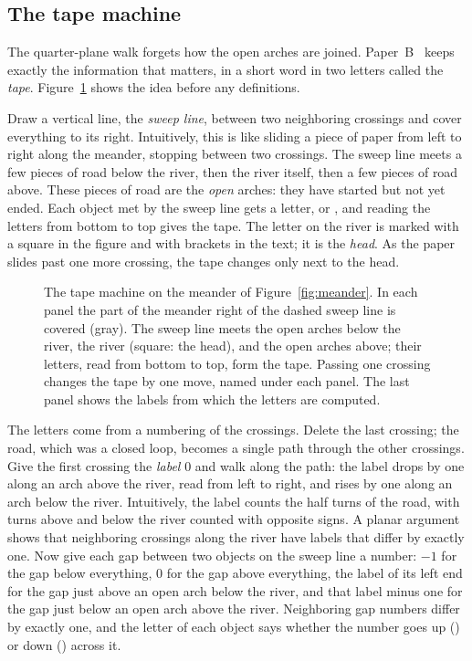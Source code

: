 \subsection{The tape machine}\label{sec:tape}

The quarter-plane walk forgets how the open arches are joined. Paper~B~\cite{PaperB} keeps exactly
the information that matters, in a short word in two letters called the \emph{tape}.
Figure~\ref{fig:film} shows the idea before any definitions.

Draw a vertical line, the \emph{sweep line}, between two neighboring crossings and cover
everything to its right. Intuitively, this is like sliding a piece of paper from left to right along the
meander, stopping between two crossings. The sweep line meets a few pieces of road below the river, then
the river itself, then a few pieces of road above. These pieces of road are the \emph{open}
arches: they have started but not yet ended. Each object met by the sweep line gets a letter, \tape{+}
or \tape{-}, and reading the letters from bottom to top gives the tape. The letter on the river
is marked with a square in the figure and with brackets in the text; it is the \emph{head}. As
the paper slides past one more crossing, the tape changes only next to the head.

\begin{figure}[ht]
\centering

\caption{The tape machine on the meander of Figure~\ref{fig:meander}. In each panel the part of
the meander right of the dashed sweep line is covered (gray). The sweep line meets the open arches below the
river, the river (square: the head), and the open arches above; their letters, read from bottom
to top, form the tape. Passing one crossing changes the tape by one move, named under each panel.
The last panel shows the labels from which the letters are computed.}
\label{fig:film}
\end{figure}

The letters come from a numbering of the crossings. Delete the last crossing; the road, which
was a closed loop, becomes a single path through the other crossings. Give the first crossing the
\emph{label} $0$ and walk along the path: the label drops by one along an arch above the river,
read from left to right, and rises by one along an arch below the river. Intuitively, the label
counts the half turns of the road, with turns above and below the river counted with opposite
signs. A planar argument shows that neighboring crossings along the river have labels that differ
by exactly one. Now give each gap between two objects on the sweep line a number: $-1$ for the gap below
everything, $0$ for the gap above everything, the label of its left end for the gap just above
an open arch below the river, and that label minus one for the gap just below an open arch above
the river. Neighboring gap numbers differ by exactly one, and the letter of each object says
whether the number goes up (\tape{+}) or down (\tape{-}) across it.

